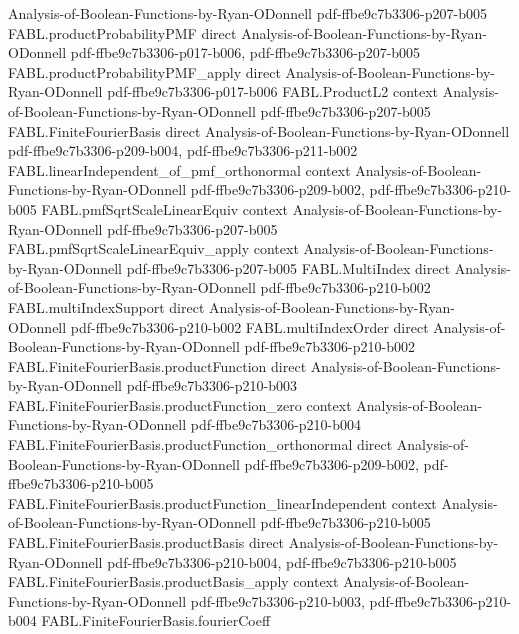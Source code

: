 \begin{theorem}
  {Analysis-of-Boolean-Functions-by-Ryan-ODonnell}
  {pdf-ffbe9c7b3306-p207-b005}
\proofstep
  {FABL.productProbabilityPMF}
  {direct}
  {Analysis-of-Boolean-Functions-by-Ryan-ODonnell}
  {pdf-ffbe9c7b3306-p017-b006,
    pdf-ffbe9c7b3306-p207-b005}
\proofstep
  {FABL.productProbabilityPMF_apply}
  {direct}
  {Analysis-of-Boolean-Functions-by-Ryan-ODonnell}
  {pdf-ffbe9c7b3306-p017-b006}
\proofstep
  {FABL.ProductL2}
  {context}
  {Analysis-of-Boolean-Functions-by-Ryan-ODonnell}
  {pdf-ffbe9c7b3306-p207-b005}
\proofstep
  {FABL.FiniteFourierBasis}
  {direct}
  {Analysis-of-Boolean-Functions-by-Ryan-ODonnell}
  {pdf-ffbe9c7b3306-p209-b004,
    pdf-ffbe9c7b3306-p211-b002}
\proofstep
  {FABL.linearIndependent_of_pmf_orthonormal}
  {context}
  {Analysis-of-Boolean-Functions-by-Ryan-ODonnell}
  {pdf-ffbe9c7b3306-p209-b002,
    pdf-ffbe9c7b3306-p210-b005}
\proofstep
  {FABL.pmfSqrtScaleLinearEquiv}
  {context}
  {Analysis-of-Boolean-Functions-by-Ryan-ODonnell}
  {pdf-ffbe9c7b3306-p207-b005}
\proofstep
  {FABL.pmfSqrtScaleLinearEquiv_apply}
  {context}
  {Analysis-of-Boolean-Functions-by-Ryan-ODonnell}
  {pdf-ffbe9c7b3306-p207-b005}
\proofstep
  {FABL.MultiIndex}
  {direct}
  {Analysis-of-Boolean-Functions-by-Ryan-ODonnell}
  {pdf-ffbe9c7b3306-p210-b002}
\proofstep
  {FABL.multiIndexSupport}
  {direct}
  {Analysis-of-Boolean-Functions-by-Ryan-ODonnell}
  {pdf-ffbe9c7b3306-p210-b002}
\proofstep
  {FABL.multiIndexOrder}
  {direct}
  {Analysis-of-Boolean-Functions-by-Ryan-ODonnell}
  {pdf-ffbe9c7b3306-p210-b002}
\proofstep
  {FABL.FiniteFourierBasis.productFunction}
  {direct}
  {Analysis-of-Boolean-Functions-by-Ryan-ODonnell}
  {pdf-ffbe9c7b3306-p210-b003}
\proofstep
  {FABL.FiniteFourierBasis.productFunction_zero}
  {context}
  {Analysis-of-Boolean-Functions-by-Ryan-ODonnell}
  {pdf-ffbe9c7b3306-p210-b004}
\proofstep
  {FABL.FiniteFourierBasis.productFunction_orthonormal}
  {direct}
  {Analysis-of-Boolean-Functions-by-Ryan-ODonnell}
  {pdf-ffbe9c7b3306-p209-b002,
    pdf-ffbe9c7b3306-p210-b005}
\proofstep
  {FABL.FiniteFourierBasis.productFunction_linearIndependent}
  {context}
  {Analysis-of-Boolean-Functions-by-Ryan-ODonnell}
  {pdf-ffbe9c7b3306-p210-b005}
\proofstep
  {FABL.FiniteFourierBasis.productBasis}
  {direct}
  {Analysis-of-Boolean-Functions-by-Ryan-ODonnell}
  {pdf-ffbe9c7b3306-p210-b004,
    pdf-ffbe9c7b3306-p210-b005}
\proofstep
  {FABL.FiniteFourierBasis.productBasis_apply}
  {context}
  {Analysis-of-Boolean-Functions-by-Ryan-ODonnell}
  {pdf-ffbe9c7b3306-p210-b003,
    pdf-ffbe9c7b3306-p210-b004}
\proofstep
  {FABL.FiniteFourierBasis.fourierCoeff}

\end{theorem}
